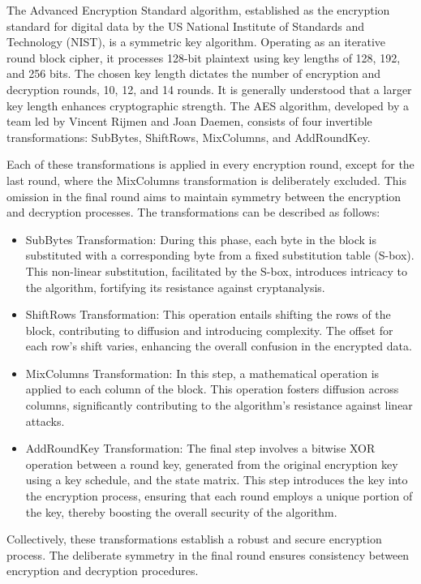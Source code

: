 \documentclass[runningheads]{llncs}
\begin{document}
The Advanced Encryption Standard algorithm, established as the encryption standard for digital data by the US National Institute of Standards and Technology (NIST), is a symmetric key algorithm. Operating as an iterative round block cipher, it processes 128-bit plaintext using key lengths of 128, 192, and 256 bits. The chosen key length dictates the number of encryption and decryption rounds, 10, 12, and 14 rounds. It is generally understood that a larger key length enhances cryptographic strength. The AES algorithm, developed by a team led by Vincent Rijmen and Joan Daemen, consists of four invertible transformations: SubBytes, ShiftRows, MixColumns, and AddRoundKey.

Each of these transformations is applied in every encryption round, except for the last round, where the MixColumns transformation is deliberately excluded. This omission in the final round aims to maintain symmetry between the encryption and decryption processes. The transformations can be described as follows:

\begin{itemize}
    \item SubBytes Transformation: During this phase, each byte in the block is substituted with a corresponding byte from a fixed substitution table (S-box). This non-linear substitution, facilitated by the S-box, introduces intricacy to the algorithm, fortifying its resistance against cryptanalysis.
    \item ShiftRows Transformation: This operation entails shifting the rows of the block, contributing to diffusion and introducing complexity. The offset for each row's shift varies, enhancing the overall confusion in the encrypted data.
    \item MixColumns Transformation: In this step, a mathematical operation is applied to each column of the block. This operation fosters diffusion across columns, significantly contributing to the algorithm's resistance against linear attacks.
    \item AddRoundKey Transformation: The final step involves a bitwise XOR operation between a round key, generated from the original encryption key using a key schedule, and the state matrix. This step introduces the key into the encryption process, ensuring that each round employs a unique portion of the key, thereby boosting the overall security of the algorithm.
\end{itemize}

Collectively, these transformations establish a robust and secure encryption process. The deliberate symmetry in the final round ensures consistency between encryption and decryption procedures.
\end{document}
